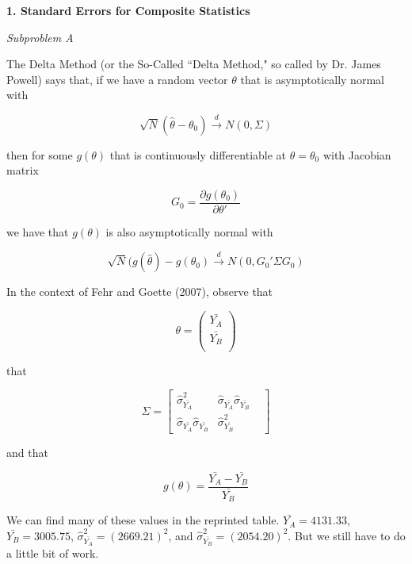 \documentclass[11pt]{article}
\begin{document}
\begin{center}
\end{center}

\bigskip \textbf{1. Standard Errors for Composite Statistics}

\bigskip \textit{Subproblem A}

\bigskip The Delta Method (or the So-Called ``Delta Method," so called by Dr. James Powell) says that, if we have a random vector $\theta$ that is asymptotically normal with

\[\sqrt{N}(\hat{\theta}-\theta_0) \overset{d}{\to} N(0,\Sigma)\]

then for some $g(\theta)$ that is continuously differentiable at $\theta=\theta_0$ with Jacobian matrix

\[G_0=\frac{\partial g(\theta_0)}{\partial \theta'}\]

we have that $g(\theta)$ is also asymptotically normal with

\[\sqrt{N}(g(\hat{\theta})-g(\theta_0) \overset{d}{\to} N(0,G_0' \Sigma G_0)\]

In the context of Fehr and Goette (2007), observe that

\[\theta =
\left(
\begin{array}{c}
	\bar{Y_A}\\
	\bar{Y_B}\\
\end{array}
\right)\]

that

\[\Sigma=
\begin{bmatrix}
\hat{\sigma}_{\bar{Y_A}}^2 & \hat{\sigma}_{\bar{Y_A}}\hat{\sigma}_{\bar{Y_B}} & \\
\hat{\sigma}_{\bar{Y_A}}\hat{\sigma}_{\bar{Y_B}} & \hat{\sigma}_{\bar{Y_B}}^2 &
\end{bmatrix}\]

and that

\[g(\theta)=\frac{\bar{Y_A}-\bar{Y_B}}{\bar{Y_B}}\]


\bigskip We can find many of these values in the reprinted table. $\bar{Y_A}=4131.33$, $\bar{Y_B}=3005.75$, $\hat{\sigma}_{\bar{Y_A}}^2=(2669.21)^2$, and $\hat{\sigma}_{\bar{Y_B}}^2=(2054.20)^2$. But we still have to do a little bit of work.
\end{document}
